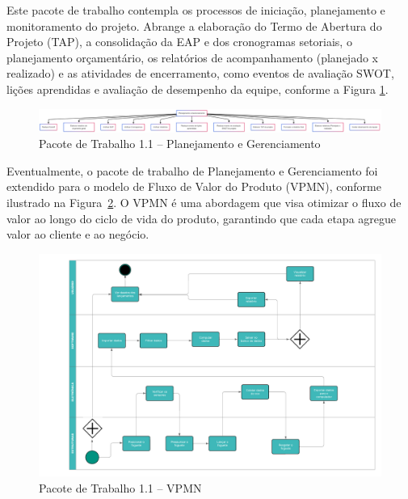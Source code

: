 Este pacote de trabalho contempla os processos de iniciação, planejamento e monitoramento do projeto. Abrange a elaboração do Termo de Abertura do Projeto (TAP), a consolidação da EAP e dos cronogramas setoriais, o planejamento orçamentário, os relatórios de acompanhamento (planejado x realizado) e as atividades de encerramento, como eventos de avaliação SWOT, lições aprendidas e avaliação de desempenho da equipe, conforme a Figura \ref{fig_eap_planejamento}.

\begin{figure}[!h]
	\centering
\includegraphics[width=15cm]{figuras/eap_planejamento.png}
	\caption{Pacote de Trabalho 1.1 – Planejamento e Gerenciamento}
	\label{fig_eap_planejamento} 
\end{figure}

\newpage

Eventualmente, o pacote de trabalho de Planejamento e Gerenciamento foi extendido para o modelo de Fluxo de Valor do Produto (VPMN), conforme ilustrado na Figura~\ref{fig_vpmn}. O VPMN é uma abordagem que visa otimizar o fluxo de valor ao longo do ciclo de vida do produto, garantindo que cada etapa agregue valor ao cliente e ao negócio.

\begin{figure}[!h]
	\centering
\includegraphics[width=15cm]{figuras/vpmn.png}
	\caption{Pacote de Trabalho 1.1 – VPMN}
	\label{fig_vpmn} 
\end{figure}



